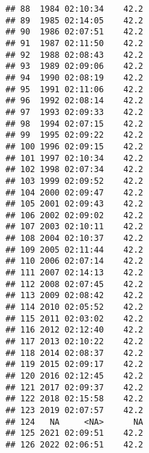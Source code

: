 \documentclass[
]{article}
\newenvironment{Shaded}{\begin{snugshade}}{\end{snugshade}}
\newcommand{\AttributeTok}[1]{\textcolor[rgb]{0.77,0.63,0.00}{#1}}
\newcommand{\CommentTok}[1]{\textcolor[rgb]{0.56,0.35,0.01}{\textit{#1}}}
\newcommand{\DecValTok}[1]{\textcolor[rgb]{0.00,0.00,0.81}{#1}}
\newcommand{\FunctionTok}[1]{\textcolor[rgb]{0.00,0.00,0.00}{#1}}
\newcommand{\NormalTok}[1]{#1}
\newcommand{\OtherTok}[1]{\textcolor[rgb]{0.56,0.35,0.01}{#1}}
\newcommand{\SpecialCharTok}[1]{\textcolor[rgb]{0.00,0.00,0.00}{#1}}
\newcommand{\StringTok}[1]{\textcolor[rgb]{0.31,0.60,0.02}{#1}}
\begin{document}
\begin{verbatim}
## 88  1984 02:10:34    42.2
## 89  1985 02:14:05    42.2
## 90  1986 02:07:51    42.2
## 91  1987 02:11:50    42.2
## 92  1988 02:08:43    42.2
## 93  1989 02:09:06    42.2
## 94  1990 02:08:19    42.2
## 95  1991 02:11:06    42.2
## 96  1992 02:08:14    42.2
## 97  1993 02:09:33    42.2
## 98  1994 02:07:15    42.2
## 99  1995 02:09:22    42.2
## 100 1996 02:09:15    42.2
## 101 1997 02:10:34    42.2
## 102 1998 02:07:34    42.2
## 103 1999 02:09:52    42.2
## 104 2000 02:09:47    42.2
## 105 2001 02:09:43    42.2
## 106 2002 02:09:02    42.2
## 107 2003 02:10:11    42.2
## 108 2004 02:10:37    42.2
## 109 2005 02:11:44    42.2
## 110 2006 02:07:14    42.2
## 111 2007 02:14:13    42.2
## 112 2008 02:07:45    42.2
## 113 2009 02:08:42    42.2
## 114 2010 02:05:52    42.2
## 115 2011 02:03:02    42.2
## 116 2012 02:12:40    42.2
## 117 2013 02:10:22    42.2
## 118 2014 02:08:37    42.2
## 119 2015 02:09:17    42.2
## 120 2016 02:12:45    42.2
## 121 2017 02:09:37    42.2
## 122 2018 02:15:58    42.2
## 123 2019 02:07:57    42.2
## 124   NA     <NA>      NA
## 125 2021 02:09:51    42.2
## 126 2022 02:06:51    42.2
\end{verbatim}

\begin{Shaded}
\end{Shaded}
\end{document}
